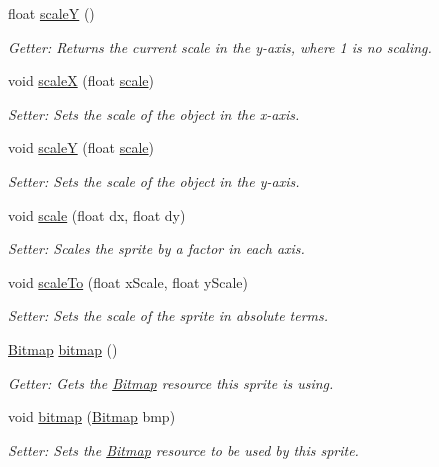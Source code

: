 \begin{DoxyCompactItemize}
float \hyperlink{class_sprite_a683509398c5d1098b0503eb223dd21f5}{scale\-Y} ()
\begin{DoxyCompactList}\small\item\em Getter\-: Returns the current scale in the y-\/axis, where 1 is no scaling. \end{DoxyCompactList}\item 
void \hyperlink{class_sprite_aacbeb81ef49aef2e1bd35e559553dd19}{scale\-X} (float \hyperlink{class_sprite_a09ad4f5df5c625c44e31f02e625a40d0}{scale})
\begin{DoxyCompactList}\small\item\em Setter\-: Sets the scale of the object in the x-\/axis. \end{DoxyCompactList}\item 
void \hyperlink{class_sprite_a9264d4d9df6995a374f3b4a0a1c8d7c8}{scale\-Y} (float \hyperlink{class_sprite_a09ad4f5df5c625c44e31f02e625a40d0}{scale})
\begin{DoxyCompactList}\small\item\em Setter\-: Sets the scale of the object in the y-\/axis. \end{DoxyCompactList}\item 
void \hyperlink{class_sprite_a09ad4f5df5c625c44e31f02e625a40d0}{scale} (float dx, float dy)
\begin{DoxyCompactList}\small\item\em Setter\-: Scales the sprite by a factor in each axis. \end{DoxyCompactList}\item 
void \hyperlink{class_sprite_a625a3ba4a2e647cf1a4d88afe9237bb3}{scale\-To} (float x\-Scale, float y\-Scale)
\begin{DoxyCompactList}\small\item\em Setter\-: Sets the scale of the sprite in absolute terms. \end{DoxyCompactList}\item 
\hyperlink{class_bitmap}{Bitmap} \hyperlink{class_sprite_a641153dcd9716e11fb1ae5ba0bfb75d3}{bitmap} ()
\begin{DoxyCompactList}\small\item\em Getter\-: Gets the \hyperlink{class_bitmap}{Bitmap} resource this sprite is using. \end{DoxyCompactList}\item 
void \hyperlink{class_sprite_a82a1a9856c2045fe3028163941942d58}{bitmap} (\hyperlink{class_bitmap}{Bitmap} bmp)
\begin{DoxyCompactList}\small\item\em Setter\-: Sets the \hyperlink{class_bitmap}{Bitmap} resource to be used by this sprite. \end{DoxyCompactList}\end{DoxyCompactItemize}
